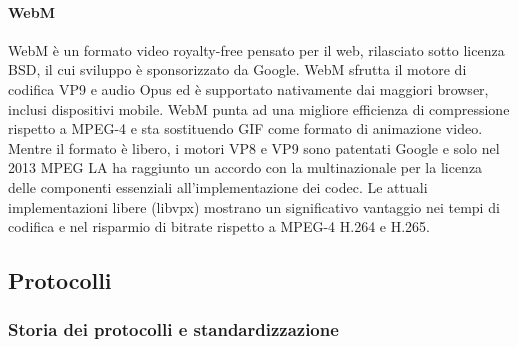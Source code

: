             \paragraph{WebM}
            WebM è un formato video royalty-free pensato per il web, rilasciato sotto licenza BSD, il cui sviluppo è sponsorizzato da Google. WebM sfrutta il motore di codifica VP9 e audio Opus ed è supportato nativamente dai maggiori browser, inclusi dispositivi mobile. WebM punta ad una migliore efficienza di compressione rispetto a MPEG-4 e sta sostituendo GIF come formato di animazione video. Mentre il formato è libero, i motori VP8 e VP9 sono patentati Google e solo nel 2013 MPEG LA ha raggiunto un accordo con la multinazionale per la licenza delle componenti essenziali all'implementazione dei codec. Le attuali implementazioni libere (libvpx) mostrano un significativo vantaggio nei tempi di codifica e nel risparmio di bitrate rispetto a MPEG-4 H.264 e H.265.

   \subsection{Protocolli}
      \subsubsection{Storia dei protocolli e standardizzazione}

